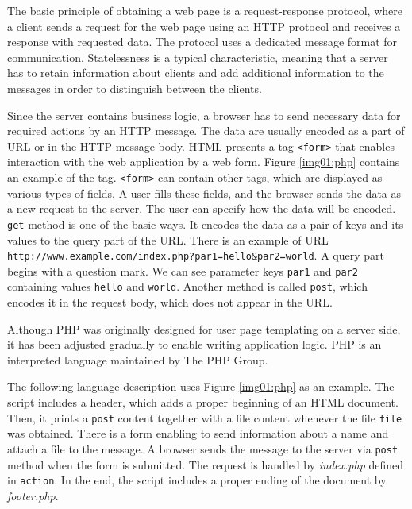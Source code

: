 The basic principle of obtaining a web page is a request-response protocol, where a client sends a request for the web page using an HTTP protocol and receives a response with requested data.
The protocol uses a dedicated message format for communication.
Statelessness is a typical characteristic, meaning that a server has to retain information about clients and add additional information to the messages in order to distinguish between the clients.
\par
Since the server contains business logic, a browser has to send necessary data for required actions by an HTTP message.
The data are usually encoded as a part of \ac{URL} or in the HTTP message body.
HTML presents a tag \texttt{<form>} that enables interaction with the web application by a web form.
Figure \ref{img01:php} contains an example of the tag.
\texttt{<form>} can contain other tags, which are displayed as various types of fields.
A user fills these fields, and the browser sends the data as a new request to the server.
The user can specify how the data will be encoded.
\texttt{get} method is one of the basic ways.
It encodes the data as a pair of keys and its values to the query part of the URL.
There is an example of URL
\texttt{http://www.example.com/index.php?par1=hello\&par2=world}.
A query part begins with a question mark.
We can see parameter keys \texttt{par1} and \texttt{par2} containing values \texttt{hello} and \texttt{world}.
Another method is called \texttt{post}, which encodes it in the request body, which does not appear in the URL.
\par
Although PHP \cite{online:phpWiki} was originally designed for user page templating on a server side, it has been adjusted gradually to enable writing application logic.
PHP is an interpreted language maintained by The PHP Group.
\par
The following language description uses Figure \ref{img01:php} as an example.
The script includes a header, which adds a proper beginning of an HTML document.
Then, it prints a \texttt{post} content together with a file content whenever the file \texttt{file} was obtained.
There is a form enabling to send information about a name and attach a file to the message.
A browser sends the message to the server via \texttt{post} method when the form is submitted.
The request is handled by \textit{index.php} defined in \texttt{action}.
In the end, the script includes a proper ending of the document by \textit{footer.php}.
\par

